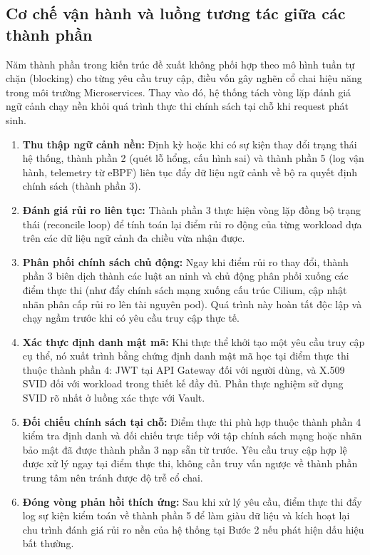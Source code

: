 
\subsection{Cơ chế vận hành và luồng tương tác giữa các thành phần}
\label{subsec:request_flow}

Năm thành phần trong kiến trúc đề xuất không phối hợp theo mô hình tuần tự chặn (blocking) cho từng yêu cầu truy cập, điều vốn gây nghẽn cổ chai hiệu năng trong môi trường Microservices. Thay vào đó, hệ thống tách vòng lặp đánh giá ngữ cảnh chạy nền khỏi quá trình thực thi chính sách tại chỗ khi request phát sinh.

\begin{enumerate}[itemsep=4pt, parsep=0pt]

    \item \textbf{Thu thập ngữ cảnh nền:} Định kỳ hoặc khi có sự kiện thay đổi trạng thái hệ thống, thành phần 2 (quét lỗ hổng, cấu hình sai) và thành phần 5 (log vận hành, telemetry từ eBPF) liên tục đẩy dữ liệu ngữ cảnh về bộ ra quyết định chính sách (thành phần 3).

    \item \textbf{Đánh giá rủi ro liên tục:} Thành phần 3 thực hiện vòng lặp đồng bộ trạng thái (reconcile loop) để tính toán lại điểm rủi ro động của từng workload dựa trên các dữ liệu ngữ cảnh đa chiều vừa nhận được.

    \item \textbf{Phân phối chính sách chủ động:} Ngay khi điểm rủi ro thay đổi, thành phần 3 biên dịch thành các luật an ninh và chủ động phân phối xuống các điểm thực thi (như đẩy chính sách mạng xuống cấu trúc Cilium, cập nhật nhãn phân cấp rủi ro lên tài nguyên pod). Quá trình này hoàn tất độc lập và chạy ngầm trước khi có yêu cầu truy cập thực tế.

    \item \textbf{Xác thực định danh mật mã:} Khi thực thể khởi tạo một yêu cầu truy cập cụ thể, nó xuất trình bằng chứng định danh mật mã học tại điểm thực thi thuộc thành phần 4: JWT tại API Gateway đối với người dùng, và X.509 SVID đối với workload trong thiết kế đầy đủ. Phần thực nghiệm sử dụng SVID rõ nhất ở luồng xác thực với Vault.

    \item \textbf{Đối chiếu chính sách tại chỗ:} Điểm thực thi phù hợp thuộc thành phần 4 kiểm tra định danh và đối chiếu trực tiếp với tập chính sách mạng hoặc nhãn bảo mật đã được thành phần 3 nạp sẵn từ trước. Yêu cầu truy cập hợp lệ được xử lý ngay tại điểm thực thi, không cần truy vấn ngược về thành phần trung tâm nên tránh được độ trễ cổ chai.

    \item \textbf{Đóng vòng phản hồi thích ứng:} Sau khi xử lý yêu cầu, điểm thực thi đẩy log sự kiện kiểm toán về thành phần 5 để làm giàu dữ liệu và kích hoạt lại chu trình đánh giá rủi ro nền của hệ thống tại Bước 2 nếu phát hiện dấu hiệu bất thường.

\end{enumerate}

